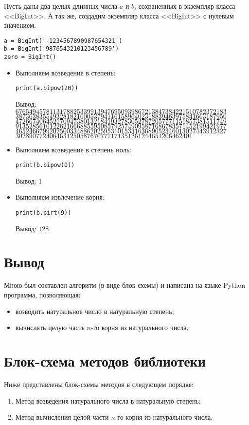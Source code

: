 Пусть даны два целых длинных числа $a$ и $b$, сохраненных в экземпляр класса <<BigInt>>.
А так же, создадим экземпляр класса <<BigInt>> с нулевым значением.
    \begin{lstlisting}
a = BigInt('-1234567890987654321')
b = BigInt('9876543210123456789')
zero = BigInt()\end{lstlisting}

    \begin{itemize}
        \item Выполняем возведение в степень:
        \begin{lstlisting}
print(a.bipow(20))\end{lstlisting}
        Вывод:\\
        $67654945781131788253399139476950939867213847384221510782372183$
        $38736383554932818216005379411615896402318839463975841663187950$
        $47266740645217094738013218419327830527872057771151857381511749$
        $91352856101226216668855950857925749095871686783571452199421977$
        $46524667992025003348862025953101533163689052346013027443912327$
        $3028907724064631250587670777171351261244651206462401$
        \item Выполняем возведение в степень ноль:
        \begin{lstlisting}
print(b.bipow(0))\end{lstlisting}
        Вывод: $1$
        \item Выполняем извлечение корня:
        \begin{lstlisting}
print(b.birt(9))\end{lstlisting}
        Вывод: $128$
    \end{itemize}

\clearpage
\section{Вывод}
Мною был составлен алгоритм (в виде блок-схемы) и написана на языке Python программа, позволяющая:
\begin{itemize}
    \item возводить натуральное число в натуральную степень;
    \item вычислять целую часть $n$-го корня из натурального числа.
\end{itemize}

\clearpage
\section{Блок-схема методов библиотеки}
Ниже представлены блок-схемы методов в следующем порядке:
\begin{enumerate}
    \item Метод возведения натурального числа в натуральную степень;
    \item Метод вычисления целой части $n$-го корня из натурального числа.
\end{enumerate}

